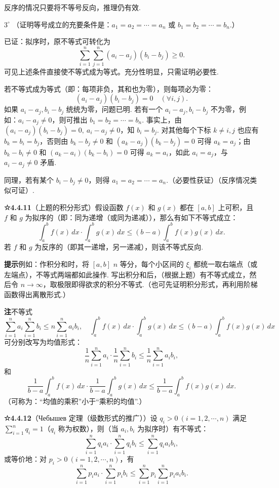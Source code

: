 \documentclass[UTF8, 12pt, fontset=fandol, oneside]{ctexart}
\begin{document}
反序的情况只要将不等号反向，推理仍有效.

$3^\circ$ （证明等号成立的充要条件是：$a_1=a_2=\cdots=a_n$ 或 $b_1=b_2=\cdots=b_n$.）

已证：拟序时，原不等式可转化为
\[
\sum_{i=1}^n\sum_{j=1}^n(a_i-a_j)(b_i-b_j)\ge0.
\]
可见上述条件直接使不等式成为等式。充分性明显，只需证明必要性.

若不等式成为等式（即：每项非负，其和也为零），则每项必为零：
\[
(a_i-a_j)(b_i-b_j)=0\quad(\forall i,j).
\]
如果 $a_i-a_j,b_i-b_j$ 统统为零，问题已明. 若有一个 $a_i-a_j,b_i-b_j$ 不为零，例如：$a_i-a_j\ne0$，则可推出 $b_1=b_2=\cdots=b_n$. 事实上，由 $(a_i-a_j)(b_i-b_j)=0,\ a_i-a_j\ne0$，知 $b_i=b_j$. 对其他每个下标 $k\ne i,j$ 也应有 $b_k=b_i=b_j$，否则由 $b_k-b_j\ne0$ 和 $(a_k-a_j)(b_k-b_j)=0$ 可得 $a_k=a_j$；由 $b_k-b_i\ne0$ 和 $(a_k-a_i)(b_k-b_i)=0$ 可得 $a_k=a_i$，如此 $a_i=a_j$，与 $a_i-a_j\ne0$ 矛盾.

同理，若有某个 $b_i-b_j\ne0$，则得 $a_1=a_2=\cdots=a_n$.（必要性获证）（反序情况类似可证）.

\noindent\textbf{☆4.4.11}\quad （上题的积分形式）假设函数 $f(x)$ 和 $g(x)$ 都在 $[a,b]$ 上可积，且 $f$ 和 $g$ 为拟序的（即：同为递增（或同为递减）），那么有如下不等式成立：
\[
\int_a^b f(x)\,dx\cdot\int_a^b g(x)\,dx
\le(b-a)\int_a^b f(x)g(x)\,dx.
\]
若 $f$ 和 $g$ 为反序的（即其一递增，另一递减），则该不等式反向.

\noindent\textbf{提示}\quad 例如：作积分和时，将 $[a,b]$ $n$ 等分，每个小区间的 $\xi_i$ 都统一取右端点（或左端点），不等式两端都如此操作. 写出积分和后，（根据上题）有不等式成立，然后令 $n\to\infty$，取极限即得欲求的积分不等式.（也可先证明积分形式，再利用阶梯函数得出离散形式.）

\noindent\textbf{注}\quad 不等式
\[
\sum_{i=1}^n a_i\sum_{i=1}^n b_i\le n\sum_{i=1}^n a_i b_i,\quad
\int_a^b f(x)\,dx\cdot\int_a^b g(x)\,dx
\le(b-a)\int_a^b f(x)g(x)\,dx
\]
可分别改写为均值形式：
\[
\frac1n\sum_{i=1}^n a_i\cdot\frac1n\sum_{i=1}^n b_i
\le\frac1n\sum_{i=1}^n a_i b_i,
\]
和
\[
\frac1{b-a}\int_a^b f(x)\,dx\cdot
\frac1{b-a}\int_a^b g(x)\,dx
\le\frac1{b-a}\int_a^b f(x)g(x)\,dx.
\]
（可称为：“均值的乘积”小于“乘积的均值”.）

\noindent\textbf{☆4.4.12}\quad （Чебышев 定理（级数形式的推广））设 $q_i>0\ (i=1,2,\cdots,n)$ 满足 $\sum_{i=1}^n q_i=1$（$q_i$ 称为权数），则（当 $a_i,b_i$ 为拟序时）有不等式：
\[
\sum_{i=1}^n q_i a_i\cdot\sum_{i=1}^n q_i b_i
\le\sum_{i=1}^n q_i a_i b_i, \tag{1}
\]
或等价地：对 $p_i>0\ (i=1,2,\cdots,n)$，有
\[
\sum_{i=1}^n p_i a_i\cdot\sum_{i=1}^n p_i b_i
\le\sum_{i=1}^n p_i\sum_{i=1}^n p_i a_i b_i. \tag{2}
\]
\end{document}

